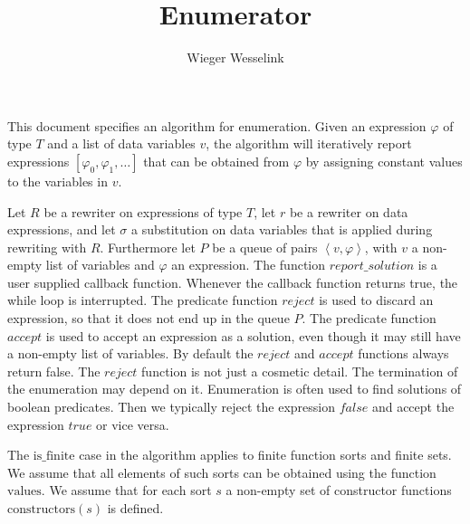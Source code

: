 \documentclass{article}
\begin{document}
\title{Enumerator}
\author{Wieger Wesselink}
\maketitle

This document specifies an algorithm for enumeration. Given an expression $\varphi$ of type $T$ and a list of data variables $v$, the algorithm will iteratively report expressions
$[\varphi_0, \varphi_1, \ldots]$ that can be obtained from $\varphi$ by assigning
constant values to the variables in $v$.

Let $R$ be a rewriter on expressions of type $T$, let $r$ be a rewriter on
data expressions, and let $\sigma $ a substitution on data variables that is
applied during rewriting with $R$. Furthermore let $P$ be a queue of pairs
$\left\langle v,\varphi \right\rangle$, with $v$ a non-empty list of variables and
$\varphi$ an expression. The function $report\_solution$ is a user supplied callback function. Whenever the callback function returns true, the while loop is interrupted.
The predicate function $reject$ is used to discard
an expression, so that it does not end up in the queue $P$. The predicate function $accept$ is used to accept an expression as a solution, even though it
may still have a non-empty list of variables. By default the $reject$ and $accept$ functions
always return false. The $reject$ function is not just a cosmetic detail. The termination of the enumeration may depend on it.
Enumeration is often used to find solutions of boolean predicates. Then we typically reject the expression $false$ and accept the expression $true$ or vice versa.

The $\mathrm{is\_finite}$ case in the algorithm applies to finite function sorts and finite sets. We assume that all elements of such sorts can be obtained using the function $\mathrm{values}$. We assume that for each sort $s$ a non-empty set of
constructor functions $\mathrm{constructors}(s)$ is defined.
\end{document}
